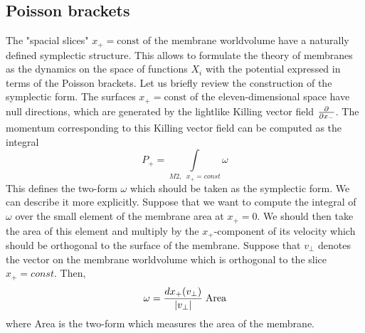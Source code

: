 \documentclass[a4paper,12pt]{article}
\begin{document}
\subsection{Poisson brackets}
The "spacial slices" $x_+=\mbox{const}$ of the membrane worldvolume have a
naturally defined symplectic structure\cite{BST,dWHN}.
This allows to formulate the theory of membranes as the
dynamics on the space of functions $X_i$ with the
potential expressed in terms of the Poisson brackets.
Let us briefly review the construction of the symplectic form.
The surfaces $x_+=\mbox{const}$ of the eleven-dimensional
space have null directions, which are generated by the lightlike
Killing vector field $\partial\over\partial x_-$.
The momentum corresponding to this Killing vector field can be
computed as the integral
\begin{equation}
P_+=\int\limits_{M2,\;\; x_+=const}\omega
\end{equation}
This defines the two-form $\omega$ which should be taken as the symplectic
form. We can describe it more explicitly. Suppose that we want to compute the integral
of $\omega$ over the small element of the membrane area at $x_+=0$.
We should then take the area of this element and
multiply by the $x_+$-component of its velocity which should be
orthogonal to the surface of the membrane. Suppose that $v_{\perp}$ denotes the vector
on the  membrane worldvolume which is orthogonal to the slice $x_+=const$. Then,
\begin{equation}
\omega={dx_+(v_{\perp})\over |v_{\perp}|}\; \mbox{Area}
\end{equation}
where Area is the two-form which measures the area of the membrane.
\end{document}
